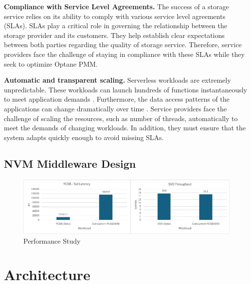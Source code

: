 \textbf{Compliance with Service Level Agreements.} The success of a storage service relies on its ability to comply with various service level agreements (SLAs). SLAs play a critical role in governing the relationship between the storage provider and its customers. They help establish clear expectations between both parties regarding the quality of storage service. Therefore, service providers face the challenge of staying in compliance with these SLAs while they seek to optimize Optane PMM. 

\textbf{Automatic and transparent scaling.} Serverless workloads are extremely unpredictable. These workloads can launch hundreds of functions instantaneously to meet application demands \cite{klimovic2018understanding}. Furthermore, the data access patterns of the applications can change dramatically over time \cite{romero2021faat,wu2019autoscaling}. Service providers face the challenge of scaling the resources, such as number of threads, automatically to meet the demands of changing workloads. In addition, they must ensure that the system adapts quickly enough to avoid missing SLAs.


\subsection{NVM Middleware Design}

\begin{figure}[ht]
  \centering
  \includegraphics[scale=0.6]{images/nvm-motivation-sla.png}
  \caption[Performance Study]{Performance Study}
\end{figure}

\section{Architecture}


